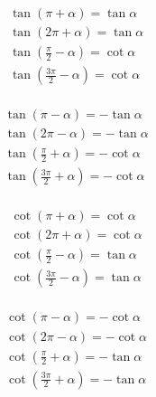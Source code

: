 \documentclass[a4paper, fleqn]{ctexart}
\begin{document}
	\begin{minipage}{0.2\textwidth}
	\small
	\begin{align*}
		& \tan\left( \pi + \alpha \right) = \tan\alpha \\
		& \tan\left( 2\pi + \alpha \right) = \tan\alpha \\
		& \tan\left( \frac\pi2 - \alpha \right) = \cot\alpha \\
		& \tan\left( \frac{3\pi}2 - \alpha \right) = \cot\alpha \\
	\end{align*}

	\begin{align*}
		& \tan\left( \pi - \alpha \right) = -\tan\alpha \\
		& \tan\left( 2\pi - \alpha \right) = -\tan\alpha \\
		& \tan\left( \frac\pi2 + \alpha \right) = -\cot\alpha \\
		& \tan\left( \frac{3\pi}2 + \alpha \right) = -\cot\alpha \\
	\end{align*}
	\end{minipage}
	\begin{minipage}{0.2\textwidth}
	\small
	\begin{align*}
		& \cot\left( \pi + \alpha \right) = \cot\alpha \\
		& \cot\left( 2\pi + \alpha \right) = \cot\alpha \\
		& \cot\left( \frac\pi2 - \alpha \right) = \tan\alpha \\
		& \cot\left( \frac{3\pi}2 - \alpha \right) = \tan\alpha \\
	\end{align*}

	\begin{align*}
		& \cot\left( \pi - \alpha \right) = -\cot\alpha \\
		& \cot\left( 2\pi - \alpha \right) = -\cot\alpha \\
		& \cot\left( \frac\pi2 + \alpha \right) = -\tan\alpha \\
		& \cot\left( \frac{3\pi}2 + \alpha \right) = -\tan\alpha \\
	\end{align*}
	\end{minipage}

	\pagebreak
		
\end{document}
